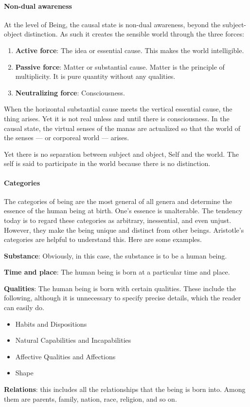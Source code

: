 \paragraph{Non-dual awareness}
At the level of Being, the causal state is non-dual awareness, beyond the subject-object distinction. As such it creates the sensible world through the three forces:

\begin{enumerate}
\item \textbf{Active force}: The idea or essential cause. This makes the world intelligible. 
\item \textbf{Passive force}: Matter or substantial cause. Matter is the principle of multiplicity. It is pure quantity without any qualities. 
\item \textbf{Neutralizing force}: Consciousness. 
\end{enumerate}
When the horizontal substantial cause meets the vertical essential cause, the thing arises. Yet it is not real unless and until there is consciousness. In the causal state, the virtual senses of the manas are actualized so that the world of the senses — or corporeal world — arises.

Yet there is no separation between subject and object, Self and the world. The self is said to participate in the world because there is no distinction.

\paragraph{Categories}
The categories of being are the most general of all genera and determine the essence of the human being at birth. One's essence is unalterable. The tendency today is to regard these categories as arbitrary, inessential, and even unjust. However, they make the being unique and distinct from other beings. Aristotle's categories are helpful to understand this. Here are some examples.

\textbf{Substance}: Obviously, in this case, the substance is to be a human being.

\textbf{Time and place}: The human being is born at a particular time and place.

\textbf{Qualities}: The human being is born with certain qualities. These include the following, although it is unnecessary to specify precise details, which the reader can easily do.

\begin{itemize}
\item Habits and Dispositions 
\item Natural Capabilities and Incapabilities 
\item Affective Qualities and Affections 
\item Shape 
\end{itemize}
\textbf{Relations}: this includes all the relationships that the being is born into. Among them are parents, family, nation, race, religion, and so on.


